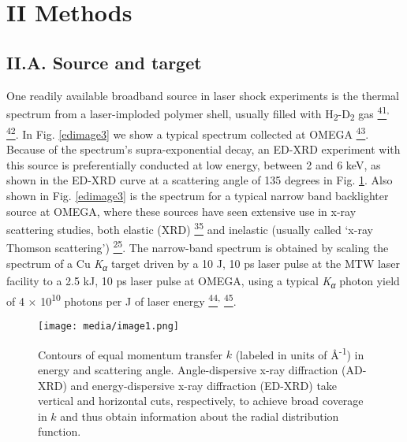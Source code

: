 \section{II Methods}\label{ii-methods}

\subsection{II.A. Source and target}

One readily available broadband source in laser shock experiments is the
thermal spectrum from a laser-imploded polymer shell, usually filled
with H\textsubscript{2}-D\textsubscript{2} gas
\hyperref[b.-r.-maddox-et-al.-physics-of-plasmas-18-056709-2011.]{\textsuperscript{41}}\textsuperscript{,}
\hyperref[b.-yaakobi-f.-j.-marshall-t.-r.-boehly-r.-p.-j.-town-and-d.-d.-meyerhofer-journal-of-the-optical-society-of-america-b-optical-physics-20-238-2003.]{\textsuperscript{42}}.
In Fig. \ref{edimage3} we show a typical spectrum collected at OMEGA
\hyperref[b.-yaakobi-2012-private-communication.]{\textsuperscript{43}}.
Because of the spectrum's supra-exponential decay, an ED-XRD experiment
with this source is preferentially conducted at low energy, between 2
and 6 keV, as shown in the ED-XRD curve at a scattering angle of 135
degrees in Fig. \ref{fig:ed1}. Also shown in Fig. \ref{edimage3} is the spectrum for a typical
narrow band backlighter source at OMEGA, where these sources have seen
extensive use in x-ray scattering studies, both elastic (XRD)
\hyperref[t.-ma-et-al.-physical-review-letters-110-065001-2013.]{\textsuperscript{35}}
and inelastic (usually called `x-ray Thomson scattering')
\hyperref[s.-h.-glenzer-and-r.-redmer-reviews-of-modern-physics-81-1625-2009.]{\textsuperscript{25}}.
The narrow-band spectrum is obtained by scaling the spectrum of a Cu
\emph{K\textsubscript{α}} target driven by a 10 J, 10 ps laser pulse at
the MTW laser facility to a 2.5 kJ, 10 ps laser pulse at OMEGA, using a
typical \emph{K\textsubscript{α}} photon yield of 4 ×
10\textsuperscript{10} photons per J of laser energy
\hyperref[p.-m.-nilson-2012-private-communication.]{\textsuperscript{44}}\textsuperscript{,}
\hyperref[k.-u.-akli-et-al.-physics-of-plasmas-14-023102-2007.]{\textsuperscript{45}}.

\begin{figure}[h]
\caption{
Contours of equal momentum transfer \(k\) (labeled in units of
Å\textsuperscript{-1}) in energy and scattering angle. Angle-dispersive
x-ray diffraction (AD-XRD) and energy-dispersive x-ray diffraction
(ED-XRD) take vertical and horizontal cuts, respectively, to achieve
broad coverage in \(k\) and thus obtain information about the radial
distribution function.
}
\label{fig:ed1}
\centering
\texttt{[image: media/image1.png]}
\end{figure}

